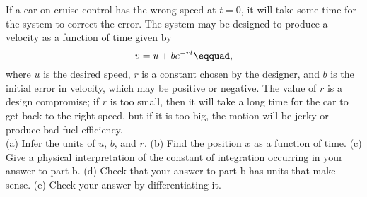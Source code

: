 If a car on cruise control has the wrong speed at $t=0$, it will take some time
for the system to correct the error. The system may be designed to
produce a velocity as a function of time given by
\begin{equation*}
  v = u+be^{-rt}\eqquad,
\end{equation*}
where $u$ is the desired speed, $r$ is a constant chosen by the designer,
and $b$ is the initial error in velocity, which may be positive or
negative. The value of $r$ is a design compromise; if $r$ is too small, then
it will take a long time for the car to get back to the right speed, but if
it is too big, the motion will be jerky or produce bad fuel efficiency.\\
(a) Infer the units of $u$, $b$, and $r$.\hwendpart
(b) Find the position $x$ as a function of time.\answercheck\hwendpart
(c) Give a physical interpretation of the constant of integration occurring in
your answer to part b.\hwendpart
(d) Check that your answer to part b has units that make sense.\hwendpart
(e) Check your answer by differentiating it.
